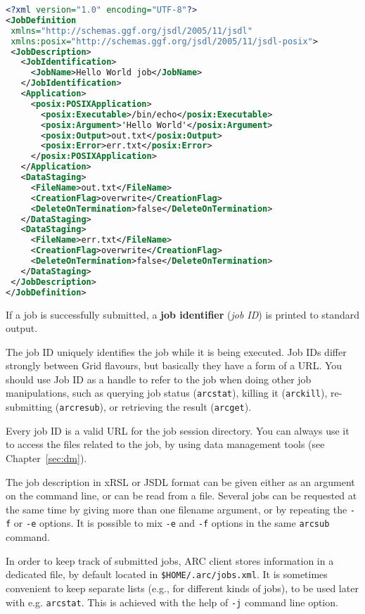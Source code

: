 \begin{lstlisting}[language=xml]
<?xml version="1.0" encoding="UTF-8"?>
<JobDefinition
 xmlns="http://schemas.ggf.org/jsdl/2005/11/jsdl"
 xmlns:posix="http://schemas.ggf.org/jsdl/2005/11/jsdl-posix">
 <JobDescription>
   <JobIdentification>
     <JobName>Hello World job</JobName>
   </JobIdentification>
   <Application>
     <posix:POSIXApplication>
       <posix:Executable>/bin/echo</posix:Executable>
       <posix:Argument>'Hello World'</posix:Argument>
       <posix:Output>out.txt</posix:Output>
       <posix:Error>err.txt</posix:Error>
     </posix:POSIXApplication>
   </Application>
   <DataStaging>
     <FileName>out.txt</FileName>
     <CreationFlag>overwrite</CreationFlag>
     <DeleteOnTermination>false</DeleteOnTermination>
   </DataStaging>
   <DataStaging>
     <FileName>err.txt</FileName>
     <CreationFlag>overwrite</CreationFlag>
     <DeleteOnTermination>false</DeleteOnTermination>
   </DataStaging>
 </JobDescription>
</JobDefinition>
\end{lstlisting}

\begin{framed}
   If a job is successfully submitted, a \textbf{job identifier}
   (\textit{job ID}) is printed to standard output.
\end{framed}

The job ID uniquely identifies the job while it is being executed. Job IDs
differ strongly between Grid flavours, but basically they have a form of a URL.
You should use Job ID as a handle to refer to the job when doing other
job manipulations, such as querying job status (\verb#arcstat#),
killing it (\verb#arckill#), re-submitting (\verb#arcresub#), or
retrieving the result (\verb#arcget#).

\begin{framed}
   Every job ID is a valid URL for the job session directory. You can
   always use it to access the files related to the job, by using data
   management tools (see Chapter~\ref{sec:dm}).
\end{framed}

The job description in xRSL or JSDL format can be given either as an
argument on the command line, or can be read from a file. Several jobs can be
requested at the same time by giving more than one filename
argument, or by repeating the \verb#-f# or \verb#-e# options. It is
possible to mix \verb#-e# and \verb#-f# options in the same
\texttt{arcsub} command.

In order to keep track of submitted jobs, ARC client stores information in a
dedicated file, by default located in \texttt{{\$}HOME/.arc/jobs.xml}. It is
sometimes convenient to keep separate lists (e.g., for different kinds of jobs),
to be used later with e.g. \verb#arcstat#. This is achieved with the help of
\verb#-j# command line option.

